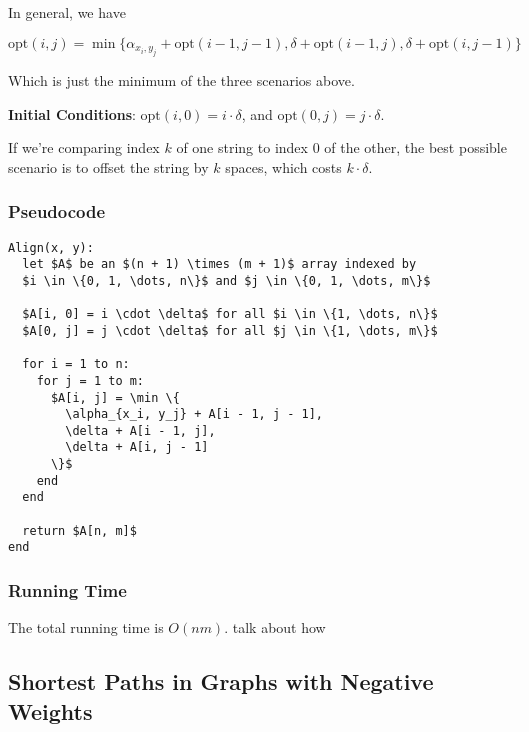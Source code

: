 \documentclass[12pt]{article}
\def\opt{\text{opt}}
\begin{document}

  In general, we have

  \[
    \opt(i, j) = \min \{
        \alpha_{x_i, y_j} + \opt(i - 1, j - 1),
        \delta + \opt(i - 1, j),
        \delta + \opt(i, j - 1)
    \}
  \]

  Which is just the minimum of the three scenarios above.

  {\bf Initial Conditions}: $\opt(i, 0) = i \cdot \delta$, and $\opt(0, j) = j
  \cdot \delta$.

  If we're comparing index $k$ of one string to index $0$ of the other, the best
  possible scenario is to offset the string by $k$ spaces, which costs $k \cdot
  \delta$.

  \subsubsection{Pseudocode}

  \begin{lstlisting}
Align(x, y):
  let $A$ be an $(n + 1) \times (m + 1)$ array indexed by
  $i \in \{0, 1, \dots, n\}$ and $j \in \{0, 1, \dots, m\}$

  $A[i, 0] = i \cdot \delta$ for all $i \in \{1, \dots, n\}$
  $A[0, j] = j \cdot \delta$ for all $j \in \{1, \dots, m\}$

  for i = 1 to n:
    for j = 1 to m:
      $A[i, j] = \min \{
        \alpha_{x_i, y_j} + A[i - 1, j - 1],
        \delta + A[i - 1, j],
        \delta + A[i, j - 1]
      \}$
    end
  end

  return $A[n, m]$
end
  \end{lstlisting}


  \subsubsection{Running Time}

  The total running time is $O(nm)$. \TODO{} talk about how




  \subsection{Shortest Paths in Graphs with Negative Weights}

\end{document}
